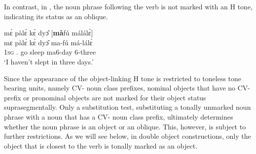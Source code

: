 \noindent In contrast, in , the noun phrase following the verb is not marked with an H tone, indicating its status as an oblique.

\ea\label{notone}
  \glll mɛ̀ pàlɛ́ kɛ̀ dyɔ̂ [{\bfseries mà}fú málálɛ̀]\textsubscript{{\OBL}} \\
       mɛ pàlɛ́ kɛ̀ dyɔ̂ {\db}ma-fú má-lálɛ̀  \\
         1\textsc{sg} {\NEG}.{\PST} go sleep {\db}ma6-day 6-three\\
    \trans `I haven't slept in three days.'
\z

\noindent Since the appearance of the object-linking H tone is restricted to toneless tone bearing units, namely CV- noun class prefixes, nominal objects that have no CV- prefix or pronominal objects are not marked for their object status suprasegmentally. Only a substitution test, substituting a tonally unmarked noun phrase with a noun that has a  CV- noun class prefix, ultimately determines whether the noun phrase is an object or an oblique. This, however, is subject to further restrictions. As we will see below, in double object constructions, only the object that is closest to the verb is tonally marked as an object.





